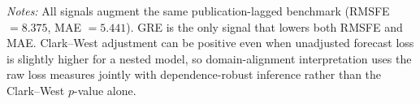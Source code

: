 \begin{table}[htbp]
\centering\small
\caption{Domain-alignment comparators at the one-month forecast horizon}
\label{tab:comparator}
\vspace{0.35em}
\begin{minipage}{0.97\textwidth}\footnotesize\textit{Notes:} All signals augment the same publication-lagged benchmark (RMSFE $=8.375$, MAE $=5.441$). GRE is the only signal that lowers both RMSFE and MAE. Clark--West adjustment can be positive even when unadjusted forecast loss is slightly higher for a nested model, so domain-alignment interpretation uses the raw loss measures jointly with dependence-robust inference rather than the Clark--West $p$-value alone.\end{minipage}
\end{table}
